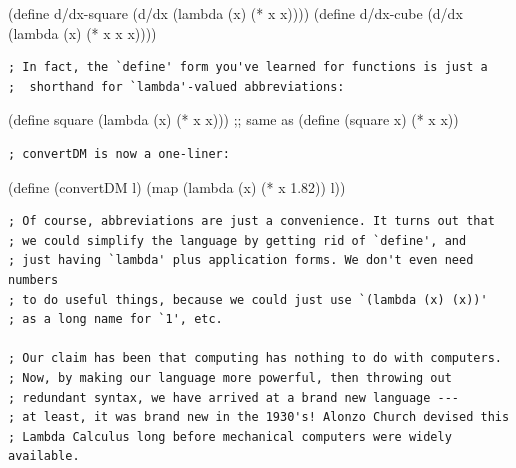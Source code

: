 \documentclass{article}
\begin{document}
\begin{schemedisplay}
(define d/dx-square (d/dx (lambda (x) (* x x))))
(define d/dx-cube (d/dx (lambda (x) (* x x x))))
\end{schemedisplay}

\begin{verbatim}
; In fact, the `define' form you've learned for functions is just a
;  shorthand for `lambda'-valued abbreviations:
\end{verbatim}

\begin{schemedisplay}
(define square (lambda (x) (* x x)))
;; same as
(define (square x) (* x x))
\end{schemedisplay}

\begin{verbatim}
; convertDM is now a one-liner:
\end{verbatim}
\begin{schemedisplay}
(define (convertDM l) (map (lambda (x) (* x 1.82)) l))
\end{schemedisplay}

\begin{verbatim}
; Of course, abbreviations are just a convenience. It turns out that
; we could simplify the language by getting rid of `define', and
; just having `lambda' plus application forms. We don't even need numbers
; to do useful things, because we could just use `(lambda (x) (x))' 
; as a long name for `1', etc.

; Our claim has been that computing has nothing to do with computers.
; Now, by making our language more powerful, then throwing out
; redundant syntax, we have arrived at a brand new language --- 
; at least, it was brand new in the 1930's! Alonzo Church devised this
; Lambda Calculus long before mechanical computers were widely available.
\end{verbatim}
\end{document}
